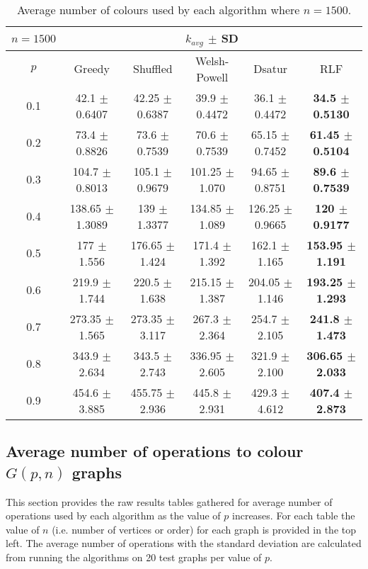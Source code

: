 \begin{table}[H]
    \centering
    \begin{tabular}{cccccc}
        
        $n = 1500$& \multicolumn{5}{c}{$k_{avg}$ $\pm$ SD} \\
        \hline
        $p$ & Greedy & Shuffled & Welsh-Powell & Dsatur & RLF \\
        \hline
0.1 & 42.1 $\pm$ 0.6407 & 42.25 $\pm$ 0.6387 & 39.9 $\pm$ 0.4472 & 36.1 $\pm$ 0.4472 & \textbf{34.5 $\pm$ 0.5130} \\
        0.2 & 73.4 $\pm$ 0.8826 & 73.6 $\pm$ 0.7539 & 70.6 $\pm$ 0.7539 & 65.15 $\pm$ 0.7452 & \textbf{61.45 $\pm$ 0.5104} \\
        0.3 & 104.7 $\pm$ 0.8013 & 105.1 $\pm$ 0.9679 & 101.25 $\pm$ 1.070 & 94.65 $\pm$ 0.8751 & \textbf{89.6 $\pm$ 0.7539} \\
        0.4 & 138.65 $\pm$ 1.3089 & 139 $\pm$ 1.3377 & 134.85 $\pm$ 1.089 & 126.25 $\pm$ 0.9665 & \textbf{120 $\pm$ 0.9177} \\
        0.5 & 177 $\pm$ 1.556 & 176.65 $\pm$ 1.424 & 171.4 $\pm$ 1.392 & 162.1 $\pm$ 1.165 & \textbf{153.95 $\pm$ 1.191} \\
        0.6 & 219.9 $\pm$ 1.744 & 220.5 $\pm$ 1.638 & 215.15 $\pm$ 1.387 & 204.05 $\pm$ 1.146 & \textbf{193.25 $\pm$ 1.293} \\
        0.7 & 273.35 $\pm$ 1.565 & 273.35 $\pm$ 3.117 & 267.3 $\pm$ 2.364 & 254.7 $\pm$ 2.105 & \textbf{241.8 $\pm$ 1.473} \\
        0.8 & 343.9 $\pm$ 2.634 & 343.5 $\pm$ 2.743 & 336.95 $\pm$ 2.605 & 321.9 $\pm$ 2.100 & \textbf{306.65 $\pm$ 2.033} \\
        0.9 & 454.6 $\pm$ 3.885 & 455.75 $\pm$ 2.936 & 445.8 $\pm$ 2.931 & 429.3 $\pm$ 4.612 & \textbf{407.4 $\pm$ 2.873} \\
        \hline
    \end{tabular}
    \caption{Average number of colours used by each algorithm where $n = 1500$.}
    \label{tab:avgKforV1500}
\end{table}

\subsection{Average number of operations to colour $G(p,n)$ graphs}

This section provides the raw results tables gathered for average number of operations used by each algorithm as the value of $p$ increases. For each table the value of $n$ (i.e. number of vertices or order) for each graph is provided in the top left. The average number of operations with the standard deviation are calculated from running the algorithms on 20 test graphs per value of $p$.

